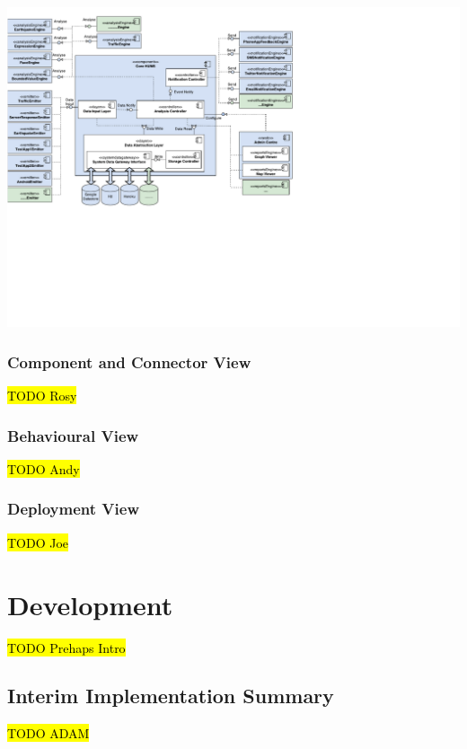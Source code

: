 \documentclass[10pt,a4paper]{article}
\begin{document}
\includegraphics[width=\textwidth]{images/component.pdf}

\subsubsection{Component and Connector View}
\hl{TODO Rosy}

\subsubsection{Behavioural View}
\hl{TODO Andy}

\subsubsection{Deployment View}
\hl{TODO Joe}
\section{Development}
\label{sec:dev}
\hl{TODO Prehaps Intro}

\subsection{Interim Implementation Summary}
\label{sec:interim_summary}
\hl{TODO ADAM}
\end{document}
